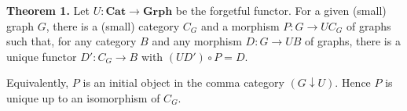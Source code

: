 \textbf{Theorem 1.} Let $U: \mathbf{Cat} \to \mathbf{Grph}$ be the forgetful functor. For a given (small) graph $G$, there is a (small) category $C_G$ and a morphism $P: G \to UC_G$ of graphs such that, for any category $B$ and any morphism $D: G \to UB$ of graphs, there is a unique functor $D': C_G \to B$ with $(UD') \circ P = D$.

Equivalently, $P$ is an initial object in the comma category $(G \downarrow U)$. Hence $P$ is unique up to an isomorphism of $C_G$.
